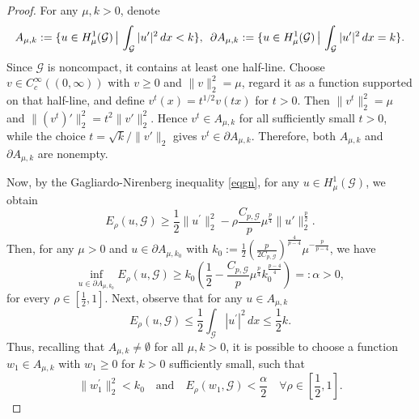 \documentclass[11pt]{amsart}
\newcommand{\norm}[1]{\lVert#1\rVert}
\newcommand{\G}{\mathcal{G}}
\numberwithin{equation}{section}
\begin{document}
\begin{proof}
For any \(\mu,k>0\), denote
\begin{equation*}
A_{\mu,k}:=\{u\in H^{1}_{\mu}(\mathcal{G})\,\big{|}\,\int_{\mathcal{G}}|u^{\prime}|^{2}\,dx<k\}, \,\,\,  \partial A_{\mu,k}:=\{u\in H^{1}_{\mu}(\mathcal{G})\,\big{|}\,\int_{\mathcal{G}}|u^{\prime}|^{2}\,dx=k\}.
\end{equation*}
Since $\mathcal{G}$ is noncompact, it contains at least one half-line. Choose $v\in C_c^\infty((0,\infty))$ with $v\geq0$ and $\|v\|_2^2=\mu$, regard it as a function supported on that half-line, and define $v^t(x)=t^{1/2}v(tx)$ for $t>0$. Then $\|v^t\|_2^2=\mu$ and $\|(v^t)'\|_2^2=t^2\|v'\|_2^2$. Hence $v^t\in A_{\mu,k}$ for all sufficiently small $t>0$, while the choice $t=\sqrt{k}/\|v'\|_2$ gives $v^t\in\partial A_{\mu,k}$. Therefore, both $A_{\mu,k}$ and $\partial A_{\mu,k}$ are nonempty.


Now, by the Gagliardo-Nirenberg inequality \eqref{eqgn}, for any $u\in H^{1}_{\mu}(\G)$, we obtain
\[
E_{\rho}(u,\G)\geq\frac{1}{2}\|u^{\prime}\|_2^2-\rho\frac{C_{p,\G} }{p}\mu^{\frac{p}{4}}\norm{u'}_2^{\frac{p}{2}}.
\]
Then, for any \(\mu>0\) and \(u\in\partial A_{\mu,k_{0}}\) with \(k_{0}:=\frac{1}{2}(\frac{p}{2C_{p,\G}})^{\frac{4}{p-4}}\mu^{-\frac{p}{p-4}}\), we have
\[
\inf_{u\in\partial A_{\mu,k_{0}}}E_{\rho}(u,\mathcal{G})\geq k_{0}\left(\frac{1}{2}-\frac{C_{p,\G}}{p}\mu^{\frac{p}{4}}k_{0}^{\frac{p-4}{4}}\right)=\colon\alpha>0,
\]
for every \(\rho\in[\frac{1}{2},1]\). Next, observe that for any \(u\in A_{\mu,k}\)
\[
E_{\rho}(u,\mathcal{G})\leq\frac{1}{2}\int_{\mathcal{G}}|u^{\prime}|^{2}\,dx\leq\frac{1}{2}k.
\]
Thus, recalling that \(A_{\mu,k}\neq\emptyset\) for all \(\mu,k>0\), it is possible to choose a function \(w_{1}\in A_{\mu,k}\)  with $w_1\geq 0$ for $k>0$ sufficiently small, such that
\begin{equation}\label{eq3.3}
\|w_{1}^{\prime}\|_2^2<k_{0}\quad\text{and}\quad E_{\rho}(w_{1},\mathcal{G})<\frac{\alpha}{2}\quad\forall\rho\in\left[\frac{1}{2},1\right].
\end{equation}


\end{proof}
\end{document}
